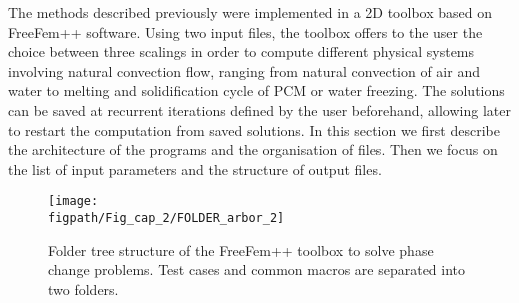 The methods described previously were implemented in a 2D toolbox based on FreeFem++ software.
Using two input files, the toolbox offers to the user the choice between three scalings in order to compute different physical systems involving natural convection flow, ranging from natural convection of air and water to melting and solidification cycle of PCM or water freezing.
The solutions can be saved at recurrent iterations defined by the user beforehand, allowing later to restart the computation from  saved solutions.
In this section we first describe the architecture of the programs and the organisation of files.
Then we focus on the list of input parameters and the structure of output files.

\begin{figure}
	\begin{center}
		\texttt{[image: \\figpath/Fig\_cap\_2/FOLDER\_arbor\_2]}
	\end{center}
	\caption{Folder tree structure of the FreeFem++ toolbox to solve phase change problems. Test cases and common macros are separated into two folders.}
	\label{fig-folder-tree}
\end{figure}

